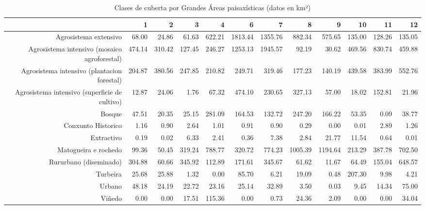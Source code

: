\begin{table}[p]
\centering
\caption{Clases de cuberta por Grandes Áreas paisaxísticas (datos en km²)} 
\label{xtaboa2}
\begin{tabular}{rrrrrrrrrrrr}
  \hline
 & 1 & 2 & 3 & 4 & 6 & 7 & 8 & 9 & 10 & 11 & 12 \\ 
  \hline
Agrosistema extensivo & 68.00 & 24.86 & 61.63 & 622.21 & 1813.44 & 1355.76 & 882.34 & 575.65 & 135.00 & 128.26 & 135.05 \\ 
  Agrosistema intensivo (mosaico agroforestal) & 474.14 & 310.42 & 127.45 & 246.27 & 1253.13 & 1945.57 & 92.19 & 30.62 & 469.56 & 830.74 & 459.88 \\ 
  Agrosistema intensivo (plantacion forestal) & 204.87 & 380.56 & 247.85 & 210.82 & 249.71 & 319.46 & 177.23 & 140.19 & 439.58 & 383.99 & 552.76 \\ 
  Agrosistema intensivo (superficie de cultivo) & 12.87 & 24.06 & 1.76 & 67.32 & 474.10 & 230.65 & 327.13 & 57.00 & 18.02 & 152.81 & 21.96 \\ 
  Bosque & 47.51 & 20.35 & 25.15 & 281.09 & 164.53 & 132.72 & 247.20 & 166.22 & 53.35 & 0.09 & 38.77 \\ 
  Conxunto Historico & 1.16 & 0.90 & 2.64 & 1.01 & 0.91 & 0.90 & 0.29 & 0.00 & 0.01 & 2.89 & 1.26 \\ 
  Extractivo & 0.19 & 0.02 & 6.33 & 2.41 & 0.36 & 7.38 & 2.84 & 21.77 & 11.54 & 0.64 & 0.01 \\ 
  Matogueira e rochedo & 99.36 & 50.45 & 319.24 & 788.77 & 320.72 & 774.23 & 1005.39 & 1194.64 & 213.29 & 387.78 & 702.50 \\ 
  Rururbano (diseminado) & 304.88 & 60.66 & 345.92 & 112.89 & 171.61 & 345.67 & 61.62 & 11.67 & 64.49 & 155.04 & 648.57 \\ 
  Turbeira & 25.68 & 25.88 & 1.32 & 0.00 & 85.70 & 6.21 & 19.09 & 0.48 & 207.30 & 9.98 & 4.21 \\ 
  Urbano & 48.18 & 24.19 & 22.72 & 23.16 & 25.14 & 32.89 & 3.50 & 0.03 & 9.45 & 14.34 & 75.00 \\ 
  Viñedo & 0.00 & 0.00 & 17.51 & 115.36 & 0.00 & 0.73 & 24.36 & 2.09 & 0.00 & 0.00 & 34.04 \\ 
   \hline
\end{tabular}
\end{table}
